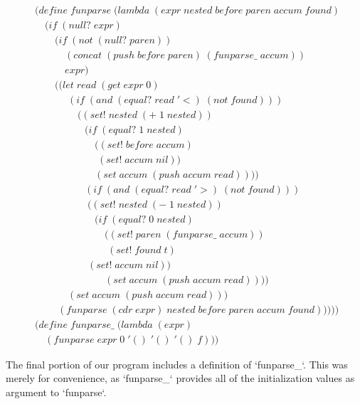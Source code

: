 \documentclass[11pt]{article}
\begin{document}
\begin{align*}
& (define \; funparse \; (lambda \; (expr \; nested \; before \; paren \; accum \; found) \; 
\\& \quad (if \; (null? \; expr)
\\& \qquad (if \; (not \; (null? \; paren))
\\& \qquad \quad (concat \; (push \; before \; paren) \; (funparse\_ \; accum))
\\& \qquad \quad expr)
\\& \qquad ((let \; read \; (get \; expr \; 0)
\\& \qquad \quad \; (if \; (and \; (equal? \; read \; '<) \; (not \; found)))
\\& \qquad \qquad \; ((set! \; nested \; (+ \; 1 \; nested))
\\& \qquad \qquad \quad (if \; (equal? \; 1 \; nested)
\\& \qquad \qquad \qquad ((set! \; before \; accum)
\\& \qquad \qquad \qquad \; (set! \; accum \; nil))
\\& \qquad \qquad \qquad (set \; accum \; (push \; accum \; read))))
\\& \qquad \qquad \quad (if \; (and \; (equal? \; read \; '>) \; (not \; found)))
\\& \qquad \qquad \quad \; ((set! \; nested \; (- \; 1 \; nested))
\\& \qquad \qquad \qquad (if \; (equal? \; 0 \; nested)
\\& \qquad \qquad \qquad \quad ((set! \; paren \; (funparse\_ \; accum))
\\& \qquad \qquad \qquad \quad \; (set! \; found \; t)
\\& \qquad \qquad \quad \; (set! \; accum \; nil))
\\& \qquad \qquad \qquad \quad (set \; accum \; (push \; accum \; read))))
\\& \qquad \quad \; (set \; accum \; (push \; accum \; read)))
\\& \qquad \; (funparse \; (cdr \; expr) \; nested \; before \; paren \; accum \; found)))))
\\& (define \; funparse\_ \; (lambda \; (expr)
\\& \quad (funparse \; expr \; 0 \; '() \; '() \; '() \; f))) \; 
\end{align*}

The final portion of our program includes a definition of `funparse\_`. This was merely for convenience, as `funparse\_` provides all of the initialization values as argument to `funparse`.
\end{document}
